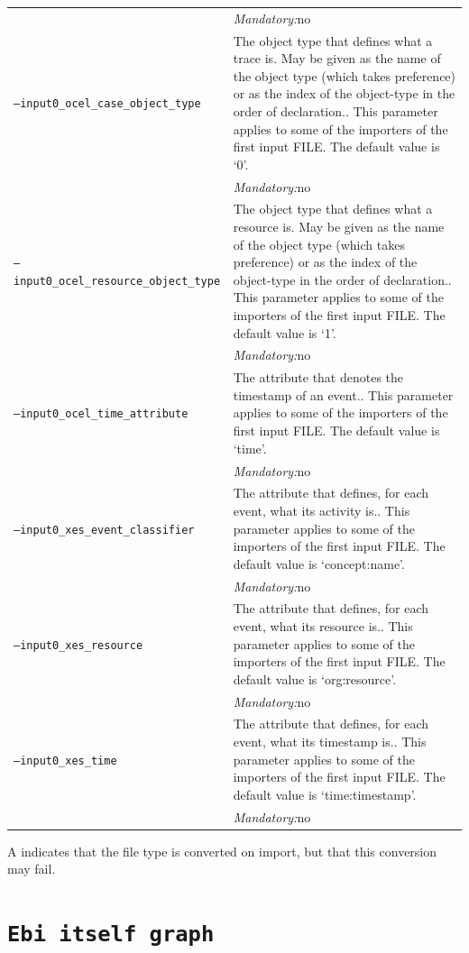 {\begin{tabularx}{\linewidth}{lX}
&\textit{Mandatory:}\quad no\\
\texttt{--input0\_ocel\_case\_object\_type} & The object type that defines what a trace is. May be given as the name of the object type (which takes preference) or as the index of the object-type in the order of declaration.. This parameter applies to some of the importers of the first input FILE. The default value is `0'.\\
&\textit{Mandatory:}\quad no\\
\texttt{--input0\_ocel\_resource\_object\_type} & The object type that defines what a resource is. May be given as the name of the object type (which takes preference) or as the index of the object-type in the order of declaration.. This parameter applies to some of the importers of the first input FILE. The default value is `1'.\\
&\textit{Mandatory:}\quad no\\
\texttt{--input0\_ocel\_time\_attribute} & The attribute that denotes the timestamp of an event.. This parameter applies to some of the importers of the first input FILE. The default value is `time'.\\
&\textit{Mandatory:}\quad no\\
\texttt{--input0\_xes\_event\_classifier} & The attribute that defines, for each event, what its activity is.. This parameter applies to some of the importers of the first input FILE. The default value is `concept:name'.\\
&\textit{Mandatory:}\quad no\\
\texttt{--input0\_xes\_resource} & The attribute that defines, for each event, what its resource is.. This parameter applies to some of the importers of the first input FILE. The default value is `org:resource'.\\
&\textit{Mandatory:}\quad no\\
\texttt{--input0\_xes\_time} & The attribute that defines, for each event, what its timestamp is.. This parameter applies to some of the importers of the first input FILE. The default value is `time:timestamp'.\\
&\textit{Mandatory:}\quad no\\
\bottomrule
\end{tabularx}
A \textdagger{} indicates that the file type is converted on import, but that this conversion may fail.
\clearpage\section{\texttt{Ebi itself graph}}
}

